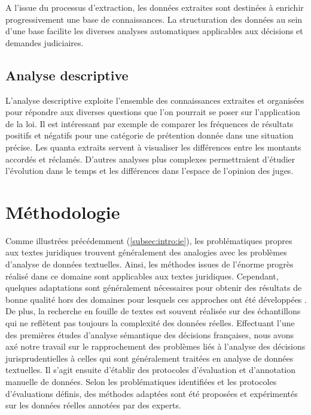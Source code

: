 A l'issue du processus d'extraction, les données extraites sont destinées à enrichir progressivement une base de connaissances. La structuration des données au sein d'une base facilite les diverses analyses automatiques applicables aux décisions et demandes judiciaires. 

\subsection{Analyse descriptive}
L'analyse descriptive exploite l'ensemble des connaissances extraites et organisées pour répondre aux diverses questions que l'on pourrait se poser sur l'application de la loi. Il est intéressant par exemple de comparer les fréquences de résultats positifs et négatifs pour une catégorie de prétention donnée dans une situation précise. Les quanta extraits servent à visualiser les différences entre les montants accordés et réclamés. D'autres analyses plus complexes permettraient d'étudier l'évolution dans le temps et les différences dans l'espace de l'opinion des juges.


\section{Méthodologie}
\label{sec:intro:methodologie}

Comme illustrées précédemment (\ref{subsec:intro:ie}), les problématiques propres aux textes juridiques trouvent généralement des analogies avec les problèmes d'analyse de données textuelles. Ainsi, les méthodes issues de l'énorme progrès réalisé dans ce domaine sont applicables aux textes juridiques. Cependant, quelques adaptations sont généralement nécessaires pour obtenir des résultats de bonne qualité hors des domaines pour lesquels ces approches ont été développées \citep{Waltl2016lexia}. De plus, la recherche en fouille de textes est souvent réalisée sur des échantillons qui ne reflètent pas toujours la complexité des données réelles. Effectuant l'une des premières études d'analyse sémantique des décisions françaises, nous avons axé notre travail sur le rapprochement des problèmes liés à l'analyse des décisions jurisprudentielles à celles qui sont généralement traitées en analyse de données textuelles. Il s'agit ensuite d'établir des protocoles d'évaluation et d'annotation manuelle de données. Selon les problématiques identifiées et les protocoles d'évaluations définis, des méthodes adaptées sont été proposées et expérimentés sur les données réelles annotées par des experts.

